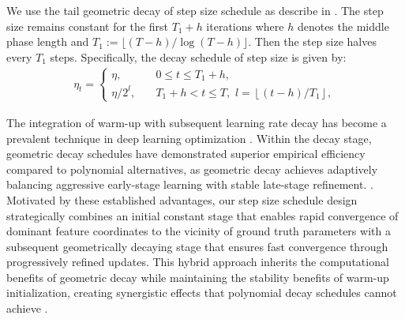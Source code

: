 We use the tail geometric decay of step size schedule as describe in \citet{wu2022last}. The step size remains constant for the first $T_1+h$ iterations where $h$ denotes the middle phase length and $T_1:=\lfloor(T-h)/\log(T-h)\rfloor$. Then the step size halves every $T_1$ steps. Specifically, the decay schedule of step size is given by:
\begin{equation}\nonumber
\begin{aligned}
\eta_t=\begin{cases}
    \eta,\quad &0\le t\le T_1+h,
    \\
    \eta/2^l,\quad &T_1+h<t\le T,\, \, l=\left \lfloor (t-h)/T_1 \right\rfloor,
\end{cases}
\end{aligned}
\end{equation}

The integration of warm-up with subsequent learning rate decay has become a prevalent technique in deep learning optimization \citep{goyal2017accurate}. Within the decay stage, geometric decay schedules have demonstrated superior empirical efficiency compared to polynomial alternatives, as geometric decay achieves adaptively balancing aggressive early-stage learning with stable late-stage refinement.  \citep{ge2019step}. Motivated by these established advantages, our step size schedule design strategically combines an initial constant stage that enables rapid convergence of dominant feature coordinates to the vicinity of ground truth parameters with a subsequent geometrically decaying stage that ensures fast convergence through progressively refined updates. This hybrid approach inherits the computational benefits of geometric decay while maintaining the stability benefits of warm-up initialization, creating synergistic effects that polynomial decay schedules cannot achieve \citep{bubeck2015convex}.


